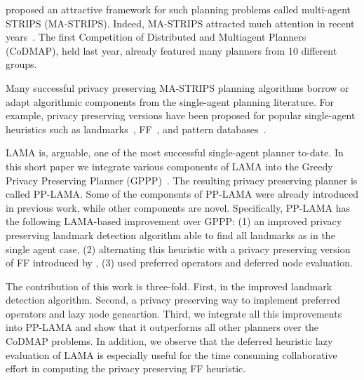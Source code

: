 \documentclass[letterpaper]{article}
\theoremstyle{definition}
\begin{document}
\cite{brafman2013complexity} proposed an attractive framework for such planning problems called multi-agent STRIPS (MA-STRIPS). Indeed, MA-STRIPS attracted much attention in recent years~\cite{tozicak2015onInternally,torreno2015global,vstolba2014relaxation,maliah2014privacyPreserving}. The first Competition of Distributed and Multiagent Planners (CoDMAP), held last year, already featured many planners from 10 different groups.


Many successful privacy preserving MA-STRIPS planning algorithms borrow or adapt algorithmic components from the single-agent planning literature. For example, privacy preserving versions have been proposed for popular single-agent heuristics such as landmarks~\cite{maliah2014privacyPreserving,torreno2015global,vstolba2015admissible}, FF~\cite{vstolba2014relaxation}, and pattern databases~\cite{maliah2015privacy}. 


LAMA is, arguable, one of the most successful single-agent planner to-date. In this short paper we integrate various components of LAMA into the Greedy Privacy Preserving Planner (GPPP)~\cite{maliah2014privacyPreserving}. The resulting privacy preserving planner is called PP-LAMA. Some of the components of PP-LAMA were already introduced in previous work, while other components are novel. Specifically, PP-LAMA has the following LAMA-based improvement over GPPP: (1) an improved privacy preserving landmark detection algorithm able to find all landmarks as in the single agent case, (2) alternating this heuristic with a privacy preserving version of  FF introduced by \cite{vstolba2014relaxation}, (3) used preferred operators and deferred node evaluation. 

The contribution of this work is three-fold. First, in the improved landmark detection algorithm. Second, a privacy preserving way to implement preferred operators and lazy node geneartion. Third, we integrate all this improvements into PP-LAMA and show that it outperforms all other planners over the CoDMAP problems. In addition, we observe that the deferred heuristic lazy evaluation of LAMA is especially useful for the time consuming collaborative effort in computing the privacy preserving FF heuristic.
\end{document}
